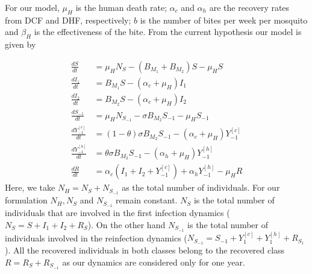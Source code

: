 For our model, $\mu_H$ is the human death rate; $\alpha_c$ and $\alpha_h$ are the recovery rates from DCF and DHF, respectively; $b$ is the number of bites per week per mosquito and $\beta_H$ is the effectiveness of the bite. From the current hypothesis our model is given by    


\begin{equation}\label{eqn:model_two_strains}
	\begin{aligned}
		\frac{dS}{dt} &=
			\mu_HN_S - (B_{M_1} + B_{M_2}) S
			-\mu_H S
		\\
		\frac{dI_1}{dt} &=
			B_{M_1} S
			-(\alpha_c + \mu_H) I_1
		\\
		\frac{dI_2}{dt} &=
			B_{M_2} S
			-(\alpha_c + \mu_H)I_2
		\\
		\frac{dS_{-1}}{dt} &=
			\mu_HN_{S_{-1}}- \sigma B_{M_2} S_{-1}-\mu_H S_{-1}
		\\
		\frac{dY_{-1} ^{[c]} }{dt} &=
			(1 - \theta) \sigma B_{M_2} S_{-1}
			-(\alpha_c + \mu_H) Y_{-1} ^ {[c]}
		\\
		\frac{dY_{-1}^{[h]}}{dt} &=
			\theta \sigma B_{M_2} S_{-1}
			-(\alpha_h + \mu_H)Y_{-1} ^{[h]} 
		\\
		\frac{dR}{dt} &= 
			\alpha_c 
				\left(
					I_1 + I_2 + Y_{-1} ^{[c]}
				\right)
			+ \alpha_h Y_{-1} ^ {[h]} - \mu_H R
	\end{aligned}
\end{equation}
Here, we take $N_H=N_S+N_{S_{-1}}$ as the total number of individuals. For our formulation $N_H, N_S$ and $N_{S_{-1}}$ remain constant. $N_S$ is the total number of individuals that are involved in the first infection dynamics ($N_S = S +I_1+I_2+R_S$). On the other hand $N_{S_{-1}}$ is the total number of individuals involved in the reinfection dynamics ($N_{S_{-1}}=S_{-1}+Y_1^{[c]}+ Y_1^{[h]}+R_{S_1}$). All the recovered individuals in both classes belong to the recovered class $R=R_S+R_{S_{-1}}$ as our dynamics are considered only for one year. 

